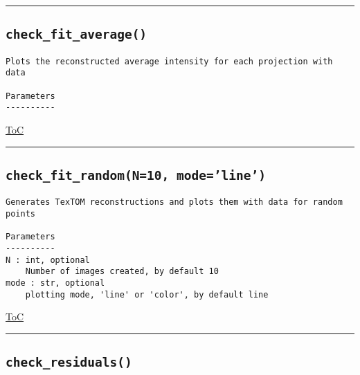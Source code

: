 \documentclass{article}
\begin{document}
\vspace{5mm}

\hrule

\subsection*{\texttt{check\_fit\_average()}}
\label{fun:checkfitaverage}

\begin{lstlisting}[language=docstring]
Plots the reconstructed average intensity for each projection with data

Parameters
----------
\end{lstlisting}

\begin{flushright}

\hyperref[toc]{ToC}

\end{flushright}



\vspace{5mm}

\hrule

\subsection*{\texttt{check\_fit\_random(N=10, mode='line')}}
\label{fun:checkfitrandom}

\begin{lstlisting}[language=docstring]
Generates TexTOM reconstructions and plots them with data for random points

Parameters
----------
N : int, optional
    Number of images created, by default 10    
mode : str, optional
    plotting mode, 'line' or 'color', by default line
\end{lstlisting}

\begin{flushright}

\hyperref[toc]{ToC}

\end{flushright}



\vspace{5mm}

\hrule

\subsection*{\texttt{check\_residuals()}}
\label{fun:checkresiduals}
\end{document}
